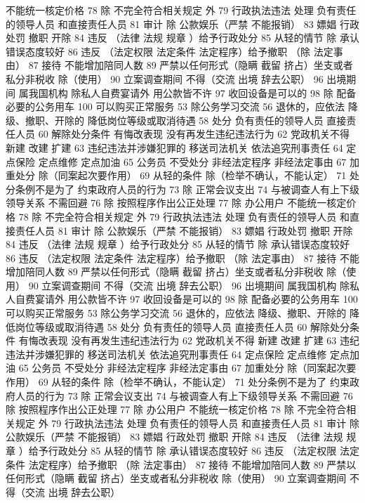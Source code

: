 \documentclass[cyan]{elegantnote}
\begin{document}
不能统一核定价格
78 除 不完全符合相关规定 外
79 行政执法违法 处理
负有责任的领导人员
和直接责任人员
81 审计
除 公款娱乐（严禁 不能报销）
83 嫖娼 行政处罚
撤职 开除
84 违反 （法律 法规 规章 ）给予行政处分
85 从轻的情节
除 承认错误态度较好
86 违反 （法定权限 法定条件 法定程序）给予撤职
（除 法定事由）
87 接待 不能增加陪同人数
89 严禁以任何形式（隐瞒 截留 挤占）坐支或者私分非税收
除（使用）
90 立案调查期间 不得（交流 出境 辞去公职）
96 出境期间 属我国机构 除私人自费宴请外 用公款皆不许
97 收回设备是可以的
98 除 配备必要的公务用车
100 可以购买正常服务
53 除公务学习交流
56 退休的，应依法
降级、撤职、开除的 降低岗位等级或取消待遇
58 处分
负有责任的领导人员
直接责任人员
60 解除处分条件
有悔改表现
没有再发生违纪违法行为
62 党政机关不得
新建 改建 扩建
63 违纪违法并涉嫌犯罪的
移送司法机关
依法追究刑事责任
64 定点保险 定点维修 定点加油
65 公务员 不受处分
非经法定程序
非经法定事由
67 加重处分
除（同案起次要作用）
69 从轻的条件
除（检举不确认，不能认定）
71 处分条例不是为了
约束政府人员的行为
73 除 正常会议支出
74 与被调查人有上下级领导关系 不需回避
76 除 按照程序作出公正处理
77 除 办公用户
不能统一核定价格
78 除 不完全符合相关规定 外
79 行政执法违法 处理
负有责任的领导人员
和直接责任人员
81 审计
除 公款娱乐（严禁 不能报销）
83 嫖娼 行政处罚
撤职 开除
84 违反 （法律 法规 规章 ）给予行政处分
85 从轻的情节
除 承认错误态度较好
86 违反 （法定权限 法定条件 法定程序）给予撤职
（除 法定事由）
87 接待 不能增加陪同人数
89 严禁以任何形式（隐瞒 截留 挤占）坐支或者私分非税收
除（使用）
90 立案调查期间 不得（交流 出境 辞去公职）
96 出境期间 属我国机构 除私人自费宴请外 用公款皆不许
97 收回设备是可以的
98 除 配备必要的公务用车
100 可以购买正常服务
53 除公务学习交流
56 退休的，应依法
降级、撤职、开除的 降低岗位等级或取消待遇
58 处分
负有责任的领导人员
直接责任人员
60 解除处分条件
有悔改表现
没有再发生违纪违法行为
62 党政机关不得
新建 改建 扩建
63 违纪违法并涉嫌犯罪的
移送司法机关
依法追究刑事责任
64 定点保险 定点维修 定点加油
65 公务员 不受处分
非经法定程序
非经法定事由
67 加重处分
除（同案起次要作用）
69 从轻的条件
除（检举不确认，不能认定）
71 处分条例不是为了
约束政府人员的行为
73 除 正常会议支出
74 与被调查人有上下级领导关系 不需回避
76 除 按照程序作出公正处理
77 除 办公用户
不能统一核定价格
78 除 不完全符合相关规定 外
79 行政执法违法 处理
负有责任的领导人员
和直接责任人员
81 审计
除 公款娱乐（严禁 不能报销）
83 嫖娼 行政处罚
撤职 开除
84 违反 （法律 法规 规章 ）给予行政处分
85 从轻的情节
除 承认错误态度较好
86 违反 （法定权限 法定条件 法定程序）给予撤职
（除 法定事由）
87 接待 不能增加陪同人数
89 严禁以任何形式（隐瞒 截留 挤占）坐支或者私分非税收
除（使用）
90 立案调查期间 不得（交流 出境 辞去公职）
\end{document}
